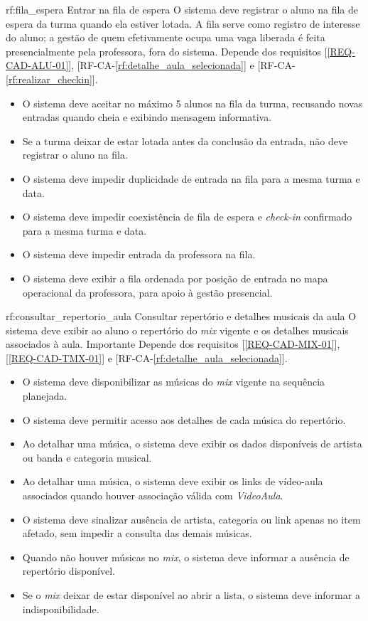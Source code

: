 \reqfunc
{rf:fila_espera}
{Entrar na fila de espera}
{O sistema deve registrar o aluno na fila de espera da turma quando ela estiver lotada. A fila serve como registro de interesse do aluno; a gestão de quem efetivamente ocupa uma vaga liberada é feita presencialmente pela professora, fora do sistema.}
{Depende dos requisitos [\ref{REQ-CAD-ALU-01}], [RF-CA-\ref{rf:detalhe_aula_selecionada}] e [RF-CA-\ref{rf:realizar_checkin}].}
{\begin{itemize}[leftmargin=0.6cm]
    \item O sistema deve aceitar no máximo 5 alunos na fila da turma, recusando novas entradas quando cheia e exibindo mensagem informativa.
    \item Se a turma deixar de estar lotada antes da conclusão da entrada, não deve registrar o aluno na fila.
    \item O sistema deve impedir duplicidade de entrada na fila para a mesma turma e data.
    \item O sistema deve impedir coexistência de fila de espera e \textit{check-in} confirmado para a mesma turma e data.
    \item O sistema deve impedir entrada da professora na fila.
    \item O sistema deve exibir a fila ordenada por posição de entrada no mapa operacional da professora, para apoio à gestão presencial.
\end{itemize}}

\reqfuncprio
{rf:consultar_repertorio_aula}
{Consultar repertório e detalhes musicais da aula}
{O sistema deve exibir ao aluno o repertório do \textit{mix} vigente e os detalhes musicais associados à aula.}
{Importante}
{Depende dos requisitos [\ref{REQ-CAD-MIX-01}], [\ref{REQ-CAD-TMX-01}] e [RF-CA-\ref{rf:detalhe_aula_selecionada}].}
{\begin{itemize}[leftmargin=0.6cm]
    \item O sistema deve disponibilizar as músicas do \textit{mix} vigente na sequência planejada.
    \item O sistema deve permitir acesso aos detalhes de cada música do repertório.
    \item Ao detalhar uma música, o sistema deve exibir os dados disponíveis de artista ou banda e categoria musical.
    \item Ao detalhar uma música, o sistema deve exibir os links de vídeo-aula associados quando houver associação válida com \textit{VideoAula}.
    \item O sistema deve sinalizar ausência de artista, categoria ou link apenas no item afetado, sem impedir a consulta das demais músicas.
    \item Quando não houver músicas no \textit{mix}, o sistema deve informar a ausência de repertório disponível.
    \item Se o \textit{mix} deixar de estar disponível ao abrir a lista, o sistema deve informar a indisponibilidade.
\end{itemize}}

